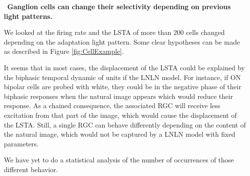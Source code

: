 \par~\textbf{Ganglion cells can change their selectivity depending on previous
    light patterns.}

We looked at the firing rate and the LSTA of more than 200 cells changed
depending on the adaptation light pattern. Some clear hypotheses can be made as
described in Figure \ref{fig:CellExample}.

It seems that in most cases, the displacement of the LSTA could be explained by
the biphasic temporal dynamic of units if the LNLN model. For instance, if ON
bipolar cells are probed with white, they could be in the negative phase of their
biphasic responses when the natural image appears which would reduce their
response. As a chained consequence, the associated RGC will receive less
excitation from that part of the image, which would cause the displacement of
the LSTA. Still, a single RGC can behave differently depending on the content
of the natural image, which would not be captured by a LNLN model with fixed
parameters.

We have yet to do a statistical analysis of the number of occurrences of those
different behavior.

